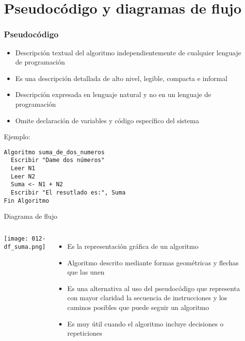 \section{Pseudocódigo y diagramas de flujo}

\begin{frame}[fragile]
  \frametitle{Pseudocódigo}
  \begin{itemize}
    \item Descripción textual del algoritmo independientemente de cualquier
      lenguaje de programación
    \pausa
    \item Es una descripción detallada de alto nivel, legible, compacta e
      informal
    \pausa
    \item Descripción expresada en lenguaje natural y no en un lenguaje de
      programación
    \pausa
    \item Omite declaración de variables y código específico del sistema
  \end{itemize}
  \pausa
  Ejemplo:
  \begin{lstlisting}[style=pseudocodigo]
Algoritmo suma_de_dos_numeros
  Escribir "Dame dos números"
  Leer N1
  Leer N2
  Suma <- N1 + N2
  Escribir "El resutlado es:", Suma
Fin Algoritmo
  \end{lstlisting}
\end{frame}

\begin{frame}[c]{Diagrama de flujo}
  \begin{columns}
      \begin{center}
        \texttt{[image: 012-df\_suma.png]}
      \end{center}
      \begin{itemize}
        \item Es la representación gráfica de un algoritmo
        \pausa
        \item Algoritmo descrito mediante formas geométricas y flechas que las unen
        \pausa
        \item Es una alternativa al uso del pseudocódigo que representa con mayor
          claridad la secuencia de instrucciones y los caminos posibles que puede
          seguir un algoritmo
        \pausa
        \item Es muy útil cuando el algoritmo incluye decisiones o repeticiones
      \end{itemize}
  \end{columns}
\end{frame}

